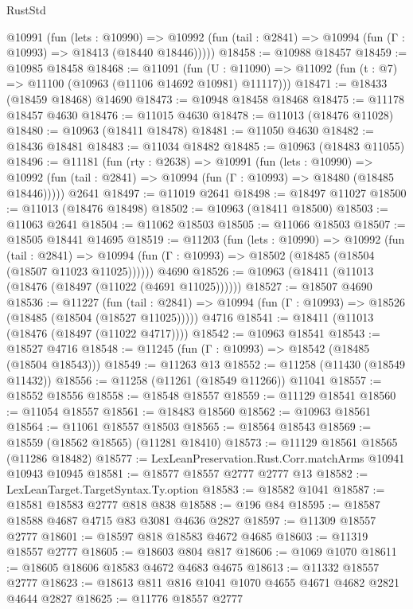 \begin{lexlean}{RustStd}
\begin{coremodule}
    @10991
      (fun (lets : @10990) =>
      @10992 (fun (tail : @2841) => @10994 (fun (Γ : @10993) => @18413 (@18440 @18446)))))
@18458 := @10988 @18457
@18459 := @10985 @18458
@18468 := @11091
    (fun (U : @11090) => @11092 (fun (t : @7) => @11100 (@10963 (@11106 @14692 @10981) @11117)))
@18471 := @18433 (@18459 @18468) @14690
@18473 := @10948 @18458 @18468
@18475 := @11178 @18457 @4630
@18476 := @11015 @4630
@18478 := @11013 (@18476 @11028)
@18480 := @10963 (@18411 @18478)
@18481 := @11050 @4630
@18482 := @18436 @18481
@18483 := @11034 @18482
@18485 := @10963 (@18483 @11055)
@18496 := @11181
    (fun (rty : @2638) =>
    @10991
      (fun (lets : @10990) =>
      @10992 (fun (tail : @2841) => @10994 (fun (Γ : @10993) => @18480 (@18485 @18446)))))
    @2641
@18497 := @11019 @2641
@18498 := @18497 @11027
@18500 := @11013 (@18476 @18498)
@18502 := @10963 (@18411 @18500)
@18503 := @11063 @2641
@18504 := @11062 @18503
@18505 := @11066 @18503
@18507 := @18505 @18441 @14695
@18519 := @11203
    (fun (lets : @10990) =>
    @10992
      (fun (tail : @2841) =>
      @10994 (fun (Γ : @10993) => @18502 (@18485 (@18504 (@18507 @11023 @11025))))))
    @4690
@18526 := @10963 (@18411 (@11013 (@18476 (@18497 (@11022 (@4691 @11025))))))
@18527 := @18507 @4690
@18536 := @11227
    (fun (tail : @2841) => @10994 (fun (Γ : @10993) => @18526 (@18485 (@18504 (@18527 @11025)))))
    @4716
@18541 := @18411 (@11013 (@18476 (@18497 (@11022 @4717))))
@18542 := @10963 @18541
@18543 := @18527 @4716
@18548 := @11245 (fun (Γ : @10993) => @18542 (@18485 (@18504 @18543)))
@18549 := @11263 @13
@18552 := @11258 (@11430 (@18549 @11432))
@18556 := @11258 (@11261 (@18549 @11266)) @11041
@18557 := @18552 @18556
@18558 := @18548 @18557
@18559 := @11129 @18541
@18560 := @11054 @18557
@18561 := @18483 @18560
@18562 := @10963 @18561
@18564 := @11061 @18557 @18503
@18565 := @18564 @18543
@18569 := @18559 (@18562 @18565) (@11281 @18410)
@18573 := @11129 @18561 @18565 (@11286 @18482)
@18577 := LexLeanPreservation.Rust.Corr.matchArms @10941 @10943 @10945
@18581 := @18577 @18557 @2777 @2777 @13
@18582 := LexLeanTarget.TargetSyntax.Ty.option
@18583 := @18582 @1041
@18587 := @18581 @18583 @2777 @818 @838
@18588 := @196 @84
@18595 := @18587 @18588 @4687 @4715 @83 @3081 @4636 @2827
@18597 := @11309 @18557 @2777
@18601 := @18597 @818 @18583 @4672 @4685
@18603 := @11319 @18557 @2777
@18605 := @18603 @804 @817
@18606 := @1069 @1070
@18611 := @18605 @18606 @18583 @4672 @4683 @4675
@18613 := @11332 @18557 @2777
@18623 := @18613 @811 @816 @1041 @1070 @4655 @4671 @4682 @2821 @4644 @2827
@18625 := @11776 @18557 @2777

\end{coremodule}
\end{lexlean}
